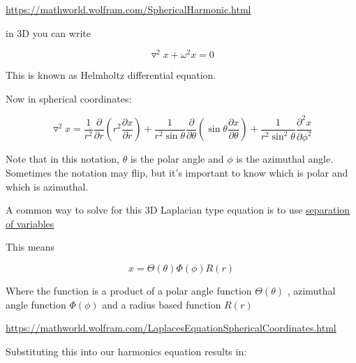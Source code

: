 \documentclass[12pt]{article}
\renewcommand{\_}{\kern-1.5pt\textunderscore\kern-1.5pt}
\begin{document}
\href{https://mathworld.wolfram.com/SphericalHarmonic.html}{https://mathworld.wolfram.com/SphericalHarmonic.html}\par

in 3D you can write\par

 \[ \triangledown ^{2}x+ \omega ^{2}x=0 \] \par

This is known as Helmholtz differential equation.\par

Now in spherical coordinates:\par

 \[ \triangledown ^{2}x=\frac{1}{r^{2}}\frac{ \partial }{ \partial r} \left( r^{2}\frac{ \partial x}{ \partial r} \right) +\frac{1}{r^{2}\sin  \theta }\frac{ \partial }{ \partial  \theta } \left( \sin  \theta \frac{ \partial x}{ \partial  \theta } \right) +\frac{1}{r^{2}\sin ^{2} \theta }\frac{ \partial ^{2}x}{ \partial  \phi ^{2}} \] \par

Note that in this notation,  \(  \theta  \)  is the polar angle and  \(  \phi  \)  is the azimuthal angle. Sometimes the notation may flip, but it’s important to know which is polar and which is azimuthal.\par

A common way to solve for this 3D Laplacian type equation is to use \uline{separation of variables}\par

This means\par

 \[ x= \Theta  \left(  \theta  \right)  \Phi  \left(  \phi  \right) R \left( r \right)  \] \par

Where the function is a product of a polar angle function  \(  \Theta  \left(  \theta  \right)  \) , azimuthal angle function  \(  \Phi  \left(  \phi  \right)  \)  and a radius based function  \( R \left( r \right)  \) \par

\href{https://mathworld.wolfram.com/LaplacesEquationSphericalCoordinates.html}{https://mathworld.wolfram.com/LaplacesEquationSphericalCoordinates.html}\par


\vspace{\baselineskip}
Substituting this into our harmonics equation results in:\par
\end{document}
